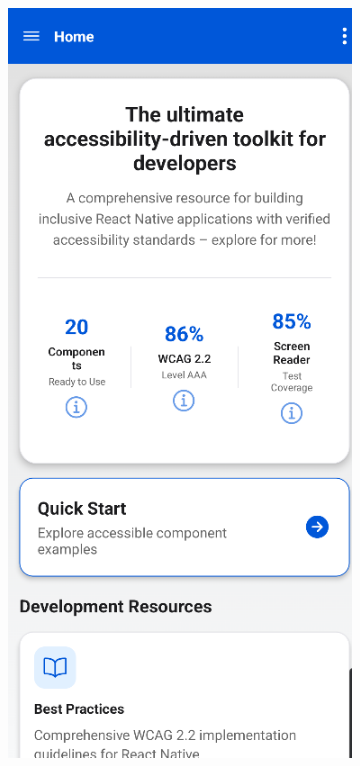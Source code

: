 \begin{figure}[ht]
\begin{subfigure}[b]{0.37\textwidth}
        \includegraphics[width=\linewidth, alt={First part of the Home screen}]{img/home1.png}

\end{subfigure}
\end{figure}
